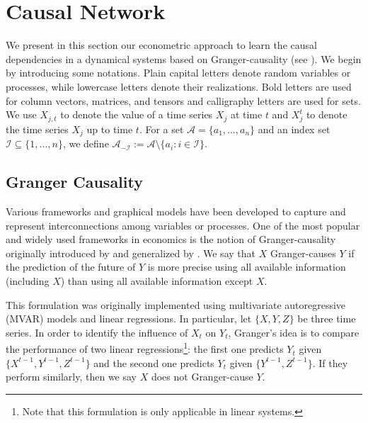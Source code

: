 

\section{Causal Network}\label{Sec1}

We present in this section our econometric approach to learn the causal dependencies in a dynamical systems based on Granger-causality (see \citet{granger}). 
We begin by introducing some notations.
Plain capital letters denote random variables or processes, while lowercase letters denote their realizations. 
Bold letters are used for column vectors, matrices, and tensors and calligraphy letters are used for sets. 
We use $X_{j,t}$ to denote the value of a time series $X_j$ at time $t$ 
and $X^{t}_j$ to denote the time series $X_j$ up to time $t$. 
For a set $\mathcal{A}=\{a_1,...,a_n\}$ and an index set $\mathcal{I}\subseteq\{1,...,n\}$, we define $\mathcal{A}_{-\mathcal{I}}:=\mathcal{A}\setminus\{a_i: i\in\mathcal{I}\}$. 



\subsection{Granger Causality}\label{sec:granger}

Various frameworks and graphical models have been developed to capture and represent interconnections among variables or processes.
One of the most popular and widely used frameworks in economics is the notion of Granger-causality originally introduced by \citet{wiener1956theory} and
generalized by \citet{granger}. We say that $X$ Granger-causes $Y$ if the prediction of the future of $Y$ is more precise using all available information (including $X$) than using all available information except $X$.

This formulation was originally implemented using multivariate autoregressive (MVAR) models and linear regressions.
In particular, let $\{X,Y,Z\}$ be three time series. In order to identify the influence of $X_t$ on $Y_t$, Granger's idea is to compare the performance of two linear regressions\footnote{Note that this formulation is only applicable in linear systems.}: the first one predicts $Y_t$ given $\{X^{t-1},Y^{t-1},Z^{t-1}\}$ and the second one predicts $Y_t$ given $\{Y^{t-1},Z^{t-1}\}$. If they perform similarly, then we say $X$ does not Granger-cause $Y$.

